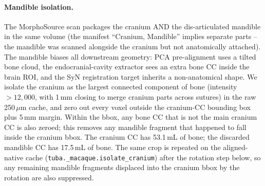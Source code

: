 \documentclass{compactarticle}
\begin{document}
\paragraph{Mandible isolation.}
The MorphoSource scan packages the cranium AND the dis-articulated
mandible in the same volume (the manifest ``Cranium, Mandible''
implies separate parts -- the mandible was scanned alongside the
cranium but not anatomically attached). The mandible biases all
downstream geometry: PCA pre-alignment uses a tilted bone cloud, the
endocranial-cavity extractor sees an extra bone CC inside the brain
ROI, and the SyN registration target inherits a non-anatomical shape.
We isolate the cranium as the largest connected component of bone
(intensity $> 12{,}000$, with 1\,mm closing to merge cranium parts
across sutures) in the raw 250\,$\mu$m cache, and zero out every voxel
outside the cranium-CC bounding box plus 5\,mm margin. Within the
bbox, any bone CC that is not the main cranium CC is also zeroed;
this removes any mandible fragment that happened to fall inside the
cranium bbox. The cranium CC has 53.1\,mL of bone; the discarded
mandible CC has 17.5\,mL of bone. The same crop is repeated on the
aligned-native cache (\texttt{tuba.\_macaque.\allowbreak isolate\_cranium})
after the rotation step below, so any remaining mandible fragments
displaced into the cranium bbox by the rotation are also suppressed.
\end{document}
